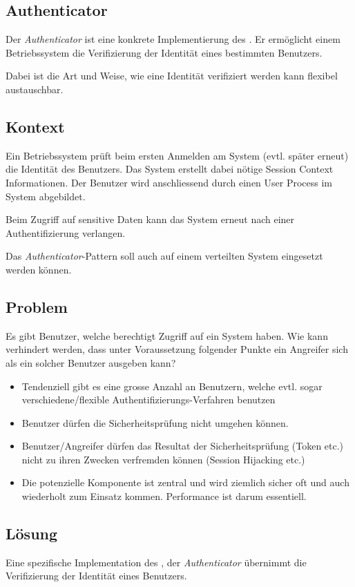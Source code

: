 \subsection{Authenticator}

Der \emph{Authenticator} ist eine konkrete Implementierung des . Er ermöglicht einem Betriebssystem die Verifizierung der Identität eines bestimmten Benutzers.

Dabei ist die Art und Weise, wie eine Identität verifiziert werden kann flexibel austauschbar.


\subsection*{Kontext}
Ein Betriebssystem prüft beim ersten Anmelden am System (evtl. später erneut) die Identität des Benutzers. Das System erstellt dabei nötige Session Context Informationen. Der Benutzer wird anschliessend durch einen User Process im System abgebildet.

Beim Zugriff auf sensitive Daten kann das System erneut nach einer Authentifizierung verlangen.

Das \emph{Authenticator}-Pattern soll auch auf einem verteilten System eingesetzt werden können.


\subsection*{Problem}
Es gibt Benutzer, welche berechtigt Zugriff auf ein System haben. Wie kann verhindert werden, dass unter Voraussetzung folgender Punkte ein Angreifer sich als ein solcher Benutzer ausgeben kann?

\begin{itemize}
	\item Tendenziell gibt es eine grosse Anzahl an Benutzern, welche evtl. sogar verschiedene/flexible Authentifizierungs-Verfahren benutzen
	\item Benutzer dürfen die Sicherheitsprüfung nicht umgehen können.
	\item Benutzer/Angreifer dürfen das Resultat der Sicherheitsprüfung (Token etc.) nicht zu ihren Zwecken verfremden können (Session Hijacking etc.)
	\item Die potenzielle Komponente ist zentral und wird ziemlich sicher oft und auch wiederholt zum Einsatz kommen. Performance ist darum essentiell.
\end{itemize}


\subsection*{Lösung}
Eine spezifische Implementation des , der \emph{Authenticator} übernimmt die Verifizierung der Identität eines Benutzers.

